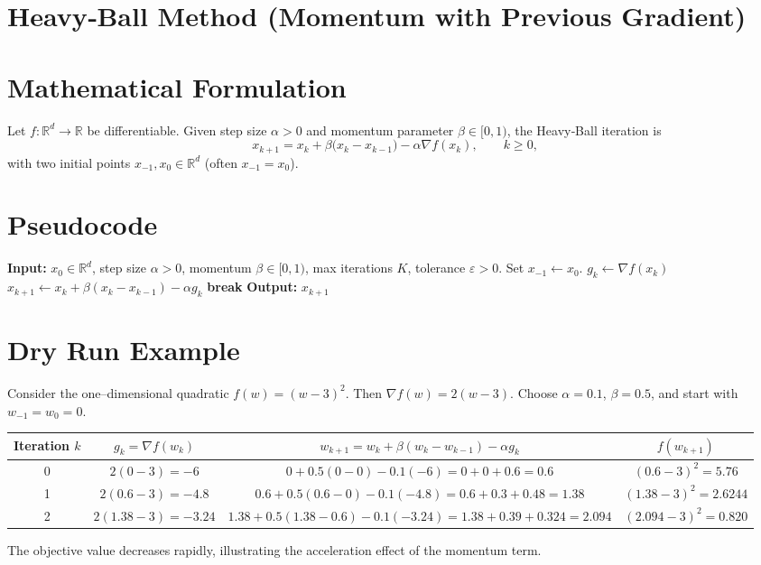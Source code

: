 \documentclass[11pt]{article}
\newcommand{\norm}[1]{\left\lVert#1\right\rVert}
\begin{document}
\section*{Heavy‑Ball Method (Momentum with Previous Gradient)}

\section*{Mathematical Formulation}
Let $f:\mathbb{R}^d\to\mathbb{R}$ be differentiable.  
Given step size $\alpha>0$ and momentum parameter $\beta\in[0,1)$, the Heavy‑Ball iteration is
\[
\boxed{
x_{k+1}=x_k+\beta\bigl(x_k-x_{k-1}\bigr)-\alpha\nabla f(x_k),\qquad k\ge 0,
}
\]
with two initial points $x_{-1},x_{0}\in\mathbb{R}^d$ (often $x_{-1}=x_0$).

\section*{Pseudocode}
\begin{algorithm}[H]
\caption{Heavy‑Ball Method}
\begin{algorithmic}[1]
\State \textbf{Input:} $x_{0}\in\mathbb{R}^d$, step size $\alpha>0$, momentum $\beta\in[0,1)$,
                 max iterations $K$, tolerance $\varepsilon>0$.
\State Set $x_{-1}\gets x_{0}$.
    \State $g_k \gets \nabla f(x_k)$
    \State $x_{k+1} \gets x_k + \beta (x_k-x_{k-1}) - \alpha g_k$
    \If{$\norm{g_k}\le \varepsilon$}
        \State \textbf{break}
    \EndIf
\EndFor
\State \textbf{Output:} $x_{k+1}$
\end{algorithmic}
\end{algorithm}

\section*{Dry Run Example}
Consider the one–dimensional quadratic $f(w)=(w-3)^2$.  
Then $\nabla f(w)=2(w-3)$. Choose $\alpha=0.1$, $\beta=0.5$, and start with $w_{-1}=w_0=0$.

\begin{center}
\begin{tabular}{c|c|c|c}
Iteration $k$ & $g_k=\nabla f(w_k)$ & $w_{k+1}=w_k+\beta(w_k-w_{k-1})-\alpha g_k$ & $f(w_{k+1})$\\ \hline
0 & $2(0-3)=-6$ &
$0+0.5(0-0)-0.1(-6)=0+0+0.6=0.6$ &
$(0.6-3)^2=5.76$\\
1 & $2(0.6-3)=-4.8$ &
$0.6+0.5(0.6-0)-0.1(-4.8)=0.6+0.3+0.48=1.38$ &
$(1.38-3)^2=2.6244$\\
2 & $2(1.38-3)=-3.24$ &
$1.38+0.5(1.38-0.6)-0.1(-3.24)=1.38+0.39+0.324=2.094$ &
$(2.094-3)^2=0.820$\\
\end{tabular}
\end{center}
The objective value decreases rapidly, illustrating the acceleration effect of the momentum term.
\end{document}
